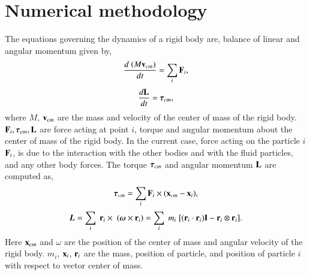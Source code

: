 \section{Numerical methodology}
\label{sec:rfc:rbd}
The equations governing the dynamics of a rigid body are, balance of linear and
angular momentum given by,
\begin{equation}
  \label{eq:rfc:balance_linear_mom}
  \frac{d \; (M \mathbf{v}_{cm})}{d t} = \sum_i \mathbf{F}_i,
\end{equation}
\begin{equation}
  \label{eq:rfc:balance_angular_mom}
  \frac{d \mathbf{L}}{d t} = \boldsymbol{\tau}_{cm},
\end{equation}
where $M$, $\mathbf{v}_{cm}$ are the mass and velocity of the center of mass of the rigid body.
$\mathbf{F}_i, \boldsymbol{\tau}_{cm}, \mathbf{L} $ are force acting at point $i$, torque and
angular momentum about the center of mass of the rigid body. In the current
case, force acting on the particle $i$ $\mathbf{F}_i$, is due to the interaction
with the other bodies and with the fluid particles, and any other body forces.
The torque $\boldsymbol{\tau}_{cm}$ and angular momentum $\mathbf{L}$ are computed as,
\begin{equation}
  \label{eq:rfc:torque}
 \boldsymbol{\tau}_{cm} = \sum_i \mathbf{F}_i \times (\mathbf{x}_{cm} - \mathbf{x}_{i}),
\end{equation}
\begin{equation}
  \label{eq:rfc:moi}
  \boldsymbol{L} =
  \sum_i \; \mathbf{r}_i \times \; (\boldsymbol{\omega} \times \mathbf{r}_i)
  = \sum_i \; m_i \; [(\mathbf{r}_i \cdot \mathbf{r}_i) \mathbf{I} - \mathbf{r}_i \otimes \mathbf{r}_i].
\end{equation}
Here $\mathbf{x}_{cm}$ and $\omega$ are the position of the center of mass and
angular velocity of the rigid body. $m_i$, $\mathbf{x}_{i}$, $\mathbf{r}_i$ are the
mass, position of particle, and position of particle $i$ with respect to vector
center of mass.

